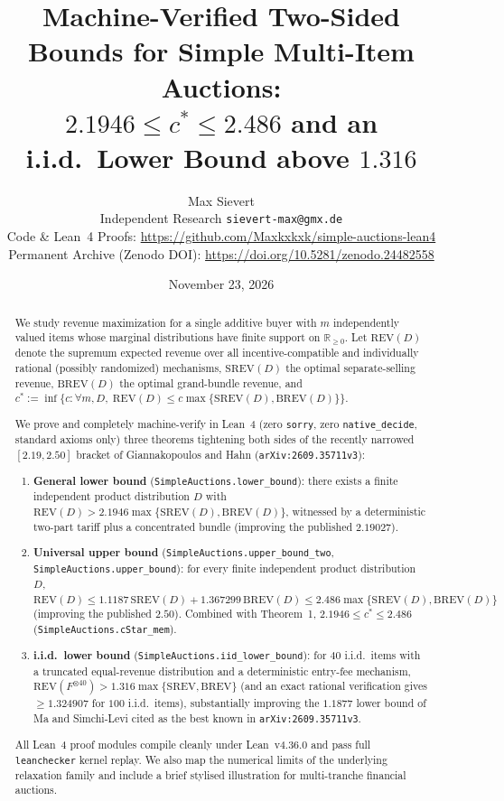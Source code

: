 \documentclass[11pt]{article}
\title{Machine-Verified Two-Sided Bounds for Simple Multi-Item Auctions:\\
$2.1946 \le c^* \le 2.486$ and an i.i.d.\ Lower Bound above $1.316$}
\author{Max Sievert\\
\small Independent Research \quad\texttt{sievert-max@gmx.de}\\
\small Code \& Lean~4 Proofs: \url{https://github.com/Maxkxkxk/simple-auctions-lean4}\\
\small Permanent Archive (Zenodo DOI): \url{https://doi.org/10.5281/zenodo.24482558}}
\date{November 23, 2026}
\newcommand{\REV}{\mathrm{REV}}
\newcommand{\SREV}{\mathrm{SREV}}
\newcommand{\BREV}{\mathrm{BREV}}
\newcommand{\R}{\mathbb{R}}
\begin{document}
\maketitle

\begin{abstract}
We study revenue maximization for a single additive buyer with $m$ independently valued items whose marginal distributions have finite support on $\R_{\ge 0}$. Let $\REV(D)$ denote the supremum expected revenue over all incentive-compatible and individually rational (possibly randomized) mechanisms, $\SREV(D)$ the optimal separate-selling revenue, $\BREV(D)$ the optimal grand-bundle revenue, and $c^* := \inf\{c : \forall m, D,\; \REV(D) \le c \max\{\SREV(D), \BREV(D)\}\}$.

We prove and completely machine-verify in Lean~4 (zero \texttt{sorry}, zero \texttt{native\_decide}, standard axioms only) three theorems tightening both sides of the recently narrowed $[2.19, 2.50]$ bracket of Giannakopoulos and Hahn (\texttt{arXiv:2609.35711v3}):
\begin{enumerate}
  \item \textbf{General lower bound} (\texttt{SimpleAuctions.lower\_bound}): there exists a finite independent product distribution $D$ with $\REV(D) > 2.1946 \max\{\SREV(D), \BREV(D)\}$, witnessed by a deterministic two-part tariff plus a concentrated bundle (improving the published $2.19027$).
  \item \textbf{Universal upper bound} (\texttt{SimpleAuctions.upper\_bound\_two}, \texttt{SimpleAuctions.upper\_bound}): for every finite independent product distribution $D$, $\REV(D) \le 1.1187\,\SREV(D) + 1.367299\,\BREV(D) \le 2.486 \max\{\SREV(D), \BREV(D)\}$ (improving the published $2.50$). Combined with Theorem~1, $2.1946 \le c^* \le 2.486$ (\texttt{SimpleAuctions.cStar\_mem}).
  \item \textbf{i.i.d.\ lower bound} (\texttt{SimpleAuctions.iid\_lower\_bound}): for $40$ i.i.d.\ items with a truncated equal-revenue distribution and a deterministic entry-fee mechanism, $\REV(F^{\otimes 40}) > 1.316 \max\{\SREV, \BREV\}$ (and an exact rational verification gives $\ge 1.324907$ for $100$ i.i.d.\ items), substantially improving the $1.1877$ lower bound of Ma and Simchi-Levi cited as the best known in \texttt{arXiv:2609.35711v3}.
\end{enumerate}
All Lean~4 proof modules compile cleanly under Lean~v4.36.0 and pass full \texttt{leanchecker} kernel replay. We also map the numerical limits of the underlying relaxation family and include a brief stylised illustration for multi-tranche financial auctions.
\end{abstract}
\end{document}
